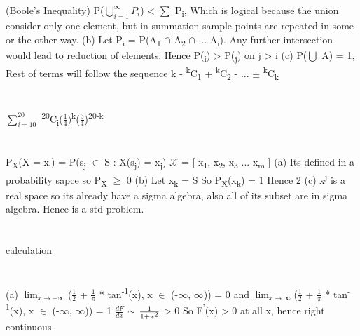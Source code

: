 \documentclass{report}
\begin{document}
{	(Boole's Inequality) 
	P($\bigcup\limits_{i=1}^{\infty} P_{i}$) < {$\sum$ P\textsubscript{i}}, Which is logical because the union consider only one element, but in summation sample points are repeated in some or the other way.
	{\newline}
	(b) Let P{\textsubscript{i}} = P(A{\textsubscript{1}} {$\cap$} A{\textsubscript{2}} {$\cap$} ... A{\textsubscript{i}}). Any further intersection would lead to reduction of elements. Hence P(\textsubscript{i}) > P(\textsubscript{j}) on j > i
	{\newline}
	(c) P({$\bigcup$} A) = 1, Rest of terms will follow the sequence k - {\textsuperscript{k}}C{\textsubscript{1}} + {\textsuperscript{k}}C{\textsubscript{2}} - ... {$\pm$} {\textsuperscript{k}}C{\textsubscript{k}}
	
	\section{}
	{$\sum_{i=10}^{20}$} {\textsuperscript{20}}C{\textsubscript{i}}{($\frac{1}{4})$}{\textsuperscript{k}}{($\frac{3}{4}$)}{\textsuperscript{20-k}}
	
	\section{}
	P{\textsubscript{X}}(X = x{\textsubscript{i}}) = P({s{\textsubscript{j} {$\in$} S : X(s{\textsubscript{j}) = x{\textsubscript{j}}}}})
	{$\mathcal{X}$} = [ x{\textsubscript{1}, x\textsubscript{2}, x{\textsubscript{3} ... x{\textsubscript{m}}}} ]
	{\newline}
	(a) Its defined in a probability sapce so P{\textsubscript{X}} {$\ge$} 0
	{\newline}
	(b) Let x{\textsubscript{k}} = S So P{\textsubscript{X}}(x{\textsubscript{k}}) = 1 Hence 2
	{\newline}
	(c) x{\textsuperscript{j}} is a real space so its already have a sigma algebra, also all of its subset are in sigma algebra. Hence is a std problem.
	{\newline}
	
	\section{}
	calculation
	
	\section{}
	(a) {$\lim_{x {\rightarrow} -{\infty}}$}({$\frac{1}{2}$} + {$\frac{1}{\pi}$} * tan{\textsuperscript{-1}}(x), x {$\in$} (-{$\infty$}, {$\infty$})) = 0 and {$\lim_{x {\rightarrow} {\infty}}$}({$\frac{1}{2}$} + {$\frac{1}{\pi}$} * tan{\textsuperscript{-1}}(x), x {$\in$} (-{$\infty$}, {$\infty$})) = 1 
	{$\frac{dF}{dx}$} {$\sim$} {$\frac{1}{1 + x{\textsuperscript{2}}}$} > 0
	So F{\textsuperscript{'}}(x) > 0 at all x, hence right continuous.
	
}
\end{document}
